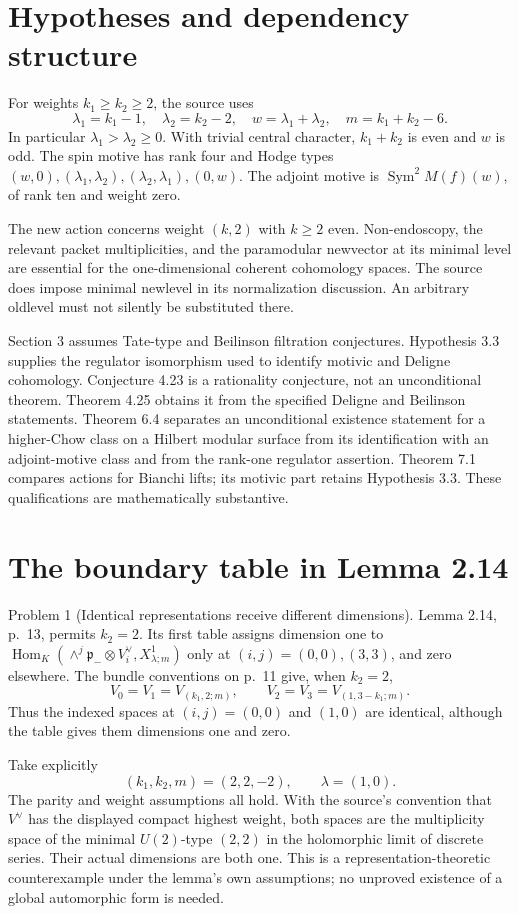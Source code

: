 \documentclass[10pt]{article}
\begin{document}
\section*{Hypotheses and dependency structure}
For weights \(k_1\ge k_2\ge2\), the source uses \[\lambda_1=k_1-1,\quad \lambda_2=k_2-2,\quad
 w=\lambda_1+\lambda_2,\quad m=k_1+k_2-6.\] In particular \(\lambda_1>\lambda_2\ge0\). With trivial central character, \(k_1+k_2\) is even and \(w\) is odd. The spin motive has rank four and Hodge types \((w,0),(\lambda_1,\lambda_2),(\lambda_2,\lambda_1),(0,w)\). The adjoint motive is \(\operatorname{Sym}^2M(f)(w)\), of rank ten and weight zero.\par
The new action concerns weight \((k,2)\) with \(k\ge2\) even. Non-endoscopy, the relevant packet multiplicities, and the paramodular newvector at its minimal level are essential for the one-dimensional coherent cohomology spaces. The source does impose minimal newlevel in its normalization discussion. An arbitrary oldlevel must not silently be substituted there.\par
Section 3 assumes Tate-type and Beilinson filtration conjectures. Hypothesis 3.3 supplies the regulator isomorphism used to identify motivic and Deligne cohomology. Conjecture 4.23 is a rationality conjecture, not an unconditional theorem. Theorem 4.25 obtains it from the specified Deligne and Beilinson statements. Theorem 6.4 separates an unconditional existence statement for a higher-Chow class on a Hilbert modular surface from its identification with an adjoint-motive class and from the rank-one regulator assertion. Theorem 7.1 compares actions for Bianchi lifts; its motivic part retains Hypothesis 3.3. These qualifications are mathematically substantive.\par
\section*{The boundary table in Lemma 2.14}
Problem 1 (Identical representations receive different dimensions).  Lemma 2.14, p. 13, permits \(k_2=2\). Its first table assigns dimension one to \(\operatorname{Hom}_K(\wedge^j\mathfrak p_-\otimes V_i^\vee,X^1_{\lambda;m})\) only at \((i,j)=(0,0),(3,3)\), and zero elsewhere. The bundle conventions on p. 11 give, when \(k_2=2\), \[V_0=V_1=V_{(k_1,2;m)},\qquad
 V_2=V_3=V_{(1,3-k_1;m)}.\] Thus the indexed spaces at \((i,j)=(0,0)\) and \((1,0)\) are identical, although the table gives them dimensions one and zero.\par
Take explicitly \[(k_1,k_2,m)=(2,2,-2),\qquad \lambda=(1,0).\] The parity and weight assumptions all hold. With the source’s convention that \(V^\vee\) has the displayed compact highest weight, both spaces are the multiplicity space of the minimal \(U(2)\)-type \((2,2)\) in the holomorphic limit of discrete series. Their actual dimensions are both one. This is a representation-theoretic counterexample under the lemma’s own assumptions; no unproved existence of a global automorphic form is needed.\par
\end{document}
